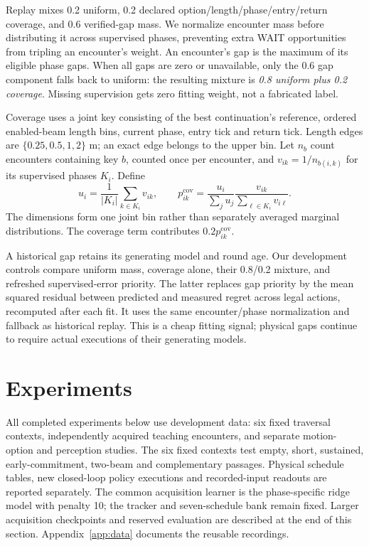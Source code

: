 \documentclass[10pt]{article}
\begin{document}
Replay mixes 0.2 uniform, 0.2 declared option/length/phase/entry/return coverage,
and 0.6 verified-gap mass. We normalize encounter mass before distributing it
across supervised phases, preventing extra WAIT opportunities from tripling an
encounter's weight. An encounter's gap is the maximum of its eligible phase gaps.
When all gaps are zero or unavailable, only the 0.6 gap component falls back to
uniform: the resulting mixture is \emph{0.8 uniform plus 0.2 coverage}. Missing
supervision gets zero fitting weight, not a fabricated label.

Coverage uses a joint key consisting of the best continuation's reference,
ordered enabled-beam length bins, current phase, entry tick and return tick.
Length edges are $\{0.25,0.5,1,2\}$ m; an exact edge belongs to the upper bin.
Let $n_b$ count encounters containing key $b$, counted once per encounter, and
$v_{ik}=1/n_{b(i,k)}$ for its supervised phases $K_i$. Define
\begin{equation}
 u_i=\frac{1}{|K_i|}\sum_{k\in K_i}v_{ik},\qquad
 p^{\mathrm{cov}}_{ik}=\frac{u_i}{\sum_j u_j}
                      \frac{v_{ik}}{\sum_{\ell\in K_i}v_{i\ell}}.
\end{equation}
The dimensions form one joint bin rather than separately averaged marginal
distributions. The coverage term contributes $0.2p^{\mathrm{cov}}_{ik}$.

A historical gap retains its generating model and round age. Our development
controls compare uniform mass, coverage alone, their 0.8/0.2 mixture, and refreshed
supervised-error priority. The latter replaces gap priority by the mean squared
residual between predicted and measured regret across legal actions, recomputed
after each fit. It uses the same encounter/phase normalization and fallback as
historical replay. This is a cheap fitting signal; physical gaps continue to
require actual executions of their generating models.

\section{Experiments}
All completed experiments below use development data: six fixed traversal
contexts, independently acquired teaching encounters, and separate motion-option
and perception studies. The six fixed contexts test empty, short, sustained,
early-commitment, two-beam and complementary passages. Physical schedule tables,
new closed-loop policy executions and recorded-input readouts are reported
separately. The common acquisition learner is the phase-specific ridge model
with penalty 10; the tracker and seven-schedule bank remain fixed. Larger
acquisition checkpoints and reserved evaluation are described at the end of
this section. Appendix~\ref{app:data} documents the reusable recordings.
\end{document}
